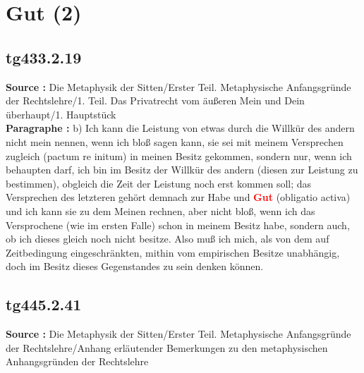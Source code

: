 \documentclass[a4paper,12pt,twoside]{book}
\newcommand{\match}[1]{\textcolor{red}{\textbf{#1}}}
\newcommand{\unnumberedsection}[1]{
	\section*{#1}
	\addcontentsline{toc}{section}{#1}
	\markright{#1}
}
\begin{document}
	\unnumberedsection{Gut (2)} 
	\subsection*{tg433.2.19} 
	\textbf{Source : }Die Metaphysik der Sitten/Erster Teil. Metaphysische Anfangsgründe der Rechtslehre/1. Teil. Das Privatrecht vom äußeren Mein und Dein überhaupt/1. Hauptstück\\  
	
	\textbf{Paragraphe : }b) Ich kann die Leistung von etwas durch die Willkür des andern nicht mein nennen, wenn ich bloß sagen kann, sie sei mit meinem Versprechen zugleich (pactum re initum) in meinen Besitz gekommen, sondern nur, wenn ich behaupten darf, ich bin im Besitz der Willkür des andern (diesen zur Leistung zu bestimmen), obgleich die Zeit der Leistung noch erst kommen soll; das Versprechen des letzteren gehört demnach zur Habe und \match{Gut} (obligatio activa) und ich kann sie zu dem Meinen rechnen, aber nicht bloß, wenn ich das Versprochene (wie im ersten Falle) schon in meinem Besitz habe, sondern auch, ob ich dieses gleich noch nicht besitze. Also muß ich mich, als von dem auf Zeitbedingung eingeschränkten, mithin vom empirischen Besitze unabhängig, doch im Besitz dieses Gegenstandes zu sein denken können. 
	
	\subsection*{tg445.2.41} 
	\textbf{Source : }Die Metaphysik der Sitten/Erster Teil. Metaphysische Anfangsgründe der Rechtslehre/Anhang erläutender Bemerkungen zu den metaphysischen Anhangsgründen der Rechtslehre\\  
	
\end{document}

